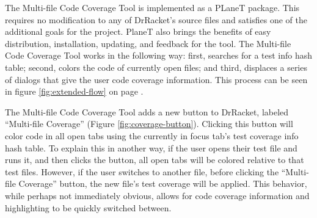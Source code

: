 The Multi-file Code Coverage Tool is implemented as a PLaneT package. This requires no modification to any of DrRacket's source files and satisfies one of the additional goals for the project. PlaneT also brings the benefits of easy distribution, installation, updating, and feedback for the tool. The Multi-file Code Coverage Tool works in the following way: first, searches for a test info hash table; second, colors the code of currently open files; and third, displaces a series of dialogs that give the user code coverage information. This process can be seen in figure \ref{fig:extended-flow} on page \pageref{fig:extended-flow}.

The Multi-file Code Coverage Tool adds a new button to DrRacket, labeled ``Multi-file Coverage'' (Figure \ref{fig:coverage-button}). Clicking this button will color code in all open tabs using the currently in focus tab's test coverage info hash table. To explain this in another way, if the user opens their test file and runs it, and then clicks the button, all open tabs will be colored relative to that test files. However, if the user switches to another file, before clicking the ``Multi-file Coverage'' button, the new file's test coverage will be applied. This behavior, while perhaps not immediately obvious, allows for code coverage information and highlighting to be quickly switched between.



